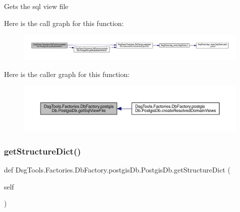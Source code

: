 \begin{DoxyVerb}Gets the sql view file
\end{DoxyVerb}
 Here is the call graph for this function\+:
\nopagebreak
\begin{figure}[H]
\begin{center}
\leavevmode
\includegraphics[width=350pt]{class_dsg_tools_1_1_factories_1_1_db_factory_1_1postgis_db_1_1_postgis_db_a2712a02bf8c2cb9bef4245b7be7ba6bd_cgraph}
\end{center}
\end{figure}
Here is the caller graph for this function\+:
\nopagebreak
\begin{figure}[H]
\begin{center}
\leavevmode
\includegraphics[width=350pt]{class_dsg_tools_1_1_factories_1_1_db_factory_1_1postgis_db_1_1_postgis_db_a2712a02bf8c2cb9bef4245b7be7ba6bd_icgraph}
\end{center}
\end{figure}
\mbox{\label{class_dsg_tools_1_1_factories_1_1_db_factory_1_1postgis_db_1_1_postgis_db_ae29ae632868ad2dbd4e57494af7f6e08}} 
\subsubsection{\texorpdfstring{get\+Structure\+Dict()}{getStructureDict()}}
{\footnotesize\ttfamily def Dsg\+Tools.\+Factories.\+Db\+Factory.\+postgis\+Db.\+Postgis\+Db.\+get\+Structure\+Dict (\begin{DoxyParamCaption}\item[{}]{self }\end{DoxyParamCaption})}

